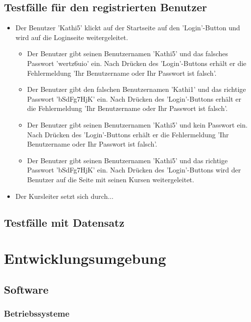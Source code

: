 \documentclass[a4paper]{scrreprt}
\newcounter{Lc}
\newcounter{Hc}
\newcommand{\stepHc}{\stepcounter{Hc}\setcounter{Lc}{0}}
\begin{document}
	\section{Testfälle für den registrierten Benutzer}
		\stepHc
		\begin{itemize}
			\item {} 
			Der Benutzer 'Kathi5' klickt auf der Startseite	auf den 'Login'-Button und wird auf die Loginseite weitergeleitet.
			\begin{itemize}
				\item Der Benutzer gibt seinen Benutzernamen 'Kathi5' und das falsches Passwort 'wertz6uio' ein. Nach Drücken des 'Login'-Buttons erhält er die Fehlermeldung 'Ihr Benutzername oder Ihr Passwort ist falsch'.
				\item Der Benutzer gibt den falschen Benutzernamen 'Kathi1' und das richtige Passwort 'bSdFg7HjK' ein. Nach Drücken des 'Login'-Buttons erhält er die Fehlermeldung 'Ihr Benutzername oder Ihr Passwort ist falsch'.
				\item Der Benutzer gibt seinen Benutzernamen 'Kathi5' und kein Passwort ein. Nach Drücken des 'Login'-Buttons erhält er die Fehlermeldung 'Ihr Benutzername oder Ihr Passwort ist falsch'.
				\item Der Benutzer gibt seinen Benutzernamen 'Kathi5' und das richtige Passwort 'bSdFg7HjK' ein. Nach Drücken des 'Login'-Buttons wird der Benutzer auf die Seite mit seinen Kursen weitergeleitet.
			\end{itemize}
			\item {} 
			Der Kursleiter setzt sich durch... 		
		\end{itemize}

\section{Testfälle mit Datensatz}






\chapter{Entwicklungsumgebung}
    \section{Software}
        \subsection{Betriebssysteme}
            
\end{document}

